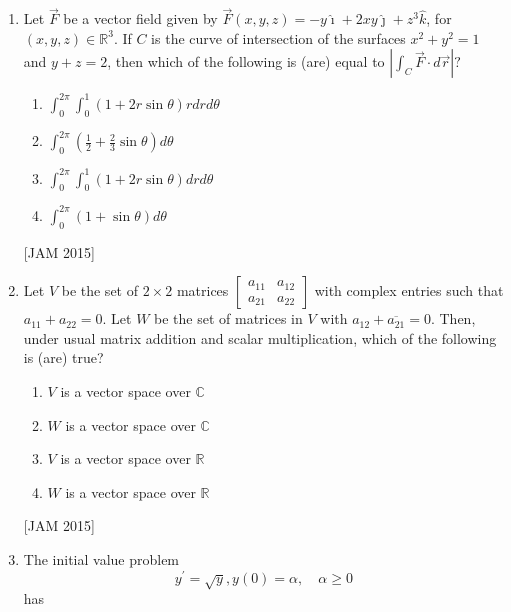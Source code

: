 \begin{enumerate}
\item  

Let $\vec{F}$ be a vector field given by $\vec{F}(x, y, z)=-y \hat{\imath}+2 x y \hat{\jmath}+z^{3} \hat{k}$, for $(x, y, z) \in \mathbb{R}^{3}$. If $C$ is the curve of intersection of the surfaces $x^{2}+y^{2}=1$ and $y+z=2$, then which of the following is (are) equal to $\left|\int_{C} \vec{F} \cdot d \vec{r}\right| ?$

\begin{enumerate}
    
\item $\int_{0}^{2 \pi} \int_{0}^{1}(1+2 r \sin \theta) r d r d \theta$\\
\item $\int_{0}^{2 \pi}\left(\frac{1}{2}+\frac{2}{3} \sin \theta\right) d \theta$\\
\item $\int_{0}^{2 \pi} \int_{0}^{1}(1+2 r \sin \theta) d r d \theta$\\
\item $\int_{0}^{2 \pi}(1+\sin \theta) d \theta$
\end{enumerate}
\hfill [JAM 2015]




\item  

Let $V$ be the set of $2 \times 2$ matrices $\left[\begin{array}{ll}a_{11} & a_{12} \\ a_{21} & a_{22}\end{array}\right]$ with complex entries such that $a_{11}+a_{22}=0$. Let $W$ be the set of matrices in $V$ with $a_{12}+\overline{a_{21}}=0$. Then, under usual matrix addition and scalar multiplication, which of the following is (are) true?

\begin{enumerate}
    \item $V$ is a vector space over $\mathbb{C}$
\item $W$ is a vector space over $\mathbb{C}$
\item $V$ is a vector space over $\mathbb{R}$
\item $W$ is a vector space over $\mathbb{R}$

\end{enumerate}
\hfill [JAM 2015]




\item  

The initial value problem
$$
y^{\prime}=\sqrt{y}, y(0)=\alpha, \quad \alpha \geq 0
$$
has


\end{enumerate}
